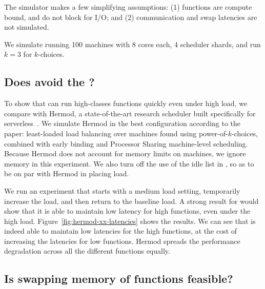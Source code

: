 The simulator makes a few simplifying assumptions: (1) functions are
compute bound, and do not block for I/O; and (2) communication and
swap latencies are not simulated.

We simulate running 100 machines with 8 cores each, 4 scheduler
shards, and run $k=3$ for $k$-choices.

\subsection{Does \sys{} avoid the \problem{}?}
\label{s:hermod}
  
To show that \sys{} can run high-classes functions quickly even under
high load, we compare \sys{} with Hermod, a state-of-the-art research
scheduler built specifically for serverless~\cite{hermod}. We simulate
Hermod in the best configuration according to the paper: least-loaded
load balancing over machines found using power-of-$k$-choices,
combined with early binding and Processor Sharing machine-level
scheduling. Because Hermod does not account for memory limits on
machines, we ignore memory in this experiment.  We also turn off the
use of the idle list in \sys{}, so as to be on par with Hermod in
placing load.

We run an experiment that starts with a medium load setting,
temporarily increase the load, and then return to the baseline load. A
strong result for \sys{} would show that it is able to maintain low
latency for high \priceclass{} functions, even under the high load.
Figure~\ref{fig:hermod-xx-latencies} shows the results. We can see
that \sys{} is indeed able to maintain low latencies for the high
\class{} functions, at the cost of increasing the latencies for low
\class{} functions. Hermod spreads the performance degradation across
all the different functions equally.

\subsection{Is swapping memory of functions feasible?}
\label{s:memory}
  

